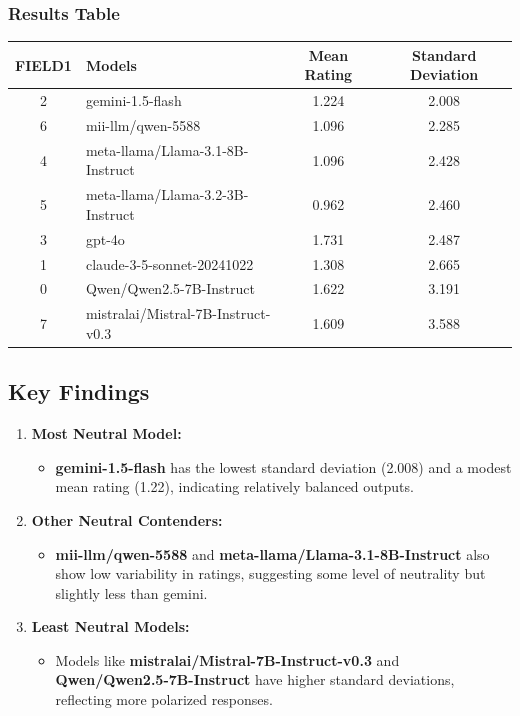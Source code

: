 \documentclass[10pt]{article}
\begin{document}
\subsubsection*{Results Table}
\begin{tabular}{|c|l|c|c|}
\hline
\textbf{FIELD1} & \textbf{Models} & \textbf{Mean Rating} & \textbf{Standard Deviation} \\
\hline
2 & gemini-1.5-flash & 1.224 & 2.008 \\
6 & mii-llm/qwen-5588 & 1.096 & 2.285 \\
4 & meta-llama/Llama-3.1-8B-Instruct & 1.096 & 2.428 \\
5 & meta-llama/Llama-3.2-3B-Instruct & 0.962 & 2.460 \\
3 & gpt-4o & 1.731 & 2.487 \\
1 & claude-3-5-sonnet-20241022 & 1.308 & 2.665 \\
0 & Qwen/Qwen2.5-7B-Instruct & 1.622 & 3.191 \\
7 & mistralai/Mistral-7B-Instruct-v0.3 & 1.609 & 3.588 \\
\hline
\end{tabular}

\subsection*{Key Findings}
\begin{enumerate}
    \item \textbf{Most Neutral Model:}
    \begin{itemize}
        \item \textbf{gemini-1.5-flash} has the lowest standard deviation (2.008) and a modest mean rating (1.22), indicating relatively balanced outputs.
    \end{itemize}
    \item \textbf{Other Neutral Contenders:}
    \begin{itemize}
        \item \textbf{mii-llm/qwen-5588} and \textbf{meta-llama/Llama-3.1-8B-Instruct} also show low variability in ratings, suggesting some level of neutrality but slightly less than gemini.
    \end{itemize}
    \item \textbf{Least Neutral Models:}
    \begin{itemize}
        \item Models like \textbf{mistralai/Mistral-7B-Instruct-v0.3} and \textbf{Qwen/Qwen2.5-7B-Instruct} have higher standard deviations, reflecting more polarized responses.
    \end{itemize}
\end{enumerate}
\end{document}
